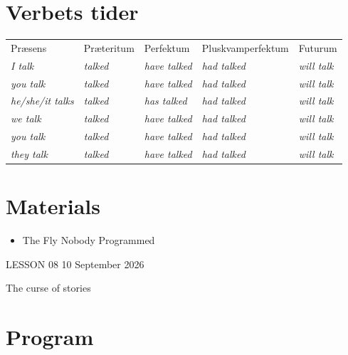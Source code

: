 \documentclass[11pt,a4paper,oneside]{book}
\begin{document}
\section*{Verbets tider}

{\small\setlength{\tabcolsep}{4pt}\renewcommand{\arraystretch}{1.3}\begin{tabularx}{\linewidth}{@{}>{\raggedright\arraybackslash}X>{\raggedright\arraybackslash}X>{\raggedright\arraybackslash}X>{\raggedright\arraybackslash}X>{\raggedright\arraybackslash}X@{}}\toprule
Præsens & Præteritum & Perfektum & Pluskvamperfektum & Futurum\\
\emph{I talk} & \emph{talked} & \emph{have talked} & \emph{had talked} & \emph{will talk}\\
\emph{you talk} & \emph{talked} & \emph{have talked} & \emph{had talked} & \emph{will talk}\\
\emph{he/she/it talks} & \emph{talked} & \emph{has talked} & \emph{had talked} & \emph{will talk}\\
\emph{we talk} & \emph{talked} & \emph{have talked} & \emph{had talked} & \emph{will talk}\\
\emph{you talk} & \emph{talked} & \emph{have talked} & \emph{had talked} & \emph{will talk}\\
\emph{they talk} & \emph{talked} & \emph{have talked} & \emph{had talked} & \emph{will talk}\\
\bottomrule\end{tabularx}}\par\medskip

\section*{Materials}

\begin{itemize}
\item The Fly Nobody Programmed
\end{itemize}

\clearpage{}
{\color{blue}\small LESSON 08 \hfill 10 September 2026\par}
\vspace{4mm}
{\displayfont\color{navy}\fontsize{30}{34}\selectfont The curse of stories\par}\vspace{4mm}

\section*{Program}
\end{document}
